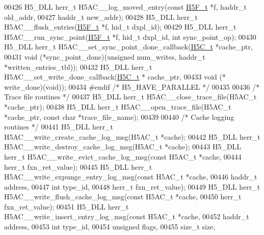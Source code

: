 \begin{DoxyCode}
00426 H5\_DLL herr\_t H5AC\_\_log\_moved\_entry(\textcolor{keyword}{const} \hyperlink{struct_h5_f__t}{H5F\_t} *f, haddr\_t old\_addr,
00427     haddr\_t new\_addr);
00428 H5\_DLL herr\_t H5AC\_\_flush\_entries(\hyperlink{struct_h5_f__t}{H5F\_t} *f, hid\_t dxpl\_id);
00429 H5\_DLL herr\_t H5AC\_\_run\_sync\_point(\hyperlink{struct_h5_f__t}{H5F\_t} *f, hid\_t dxpl\_id, \textcolor{keywordtype}{int} sync\_point\_op);
00430 H5\_DLL herr\_t H5AC\_\_set\_sync\_point\_done\_callback(\hyperlink{struct_h5_c__t}{H5C\_t} *cache\_ptr,
00431     \textcolor{keywordtype}{void} (*sync\_point\_done)(\textcolor{keywordtype}{unsigned} num\_writes, haddr\_t *written\_entries\_tbl));
00432 H5\_DLL herr\_t H5AC\_\_set\_write\_done\_callback(\hyperlink{struct_h5_c__t}{H5C\_t} * cache\_ptr,
00433     \textcolor{keywordtype}{void} (* write\_done)(\textcolor{keywordtype}{void}));
00434 \textcolor{preprocessor}{#endif }\textcolor{comment}{/* H5\_HAVE\_PARALLEL */}\textcolor{preprocessor}{}
00435 
00436 \textcolor{comment}{/* Trace file routines */}
00437 H5\_DLL herr\_t H5AC\_\_close\_trace\_file(H5AC\_t *cache\_ptr);
00438 H5\_DLL herr\_t H5AC\_\_open\_trace\_file(H5AC\_t *cache\_ptr, \textcolor{keyword}{const} \textcolor{keywordtype}{char} *trace\_file\_name);
00439 
00440 \textcolor{comment}{/* Cache logging routines */}
00441 H5\_DLL herr\_t H5AC\_\_write\_create\_cache\_log\_msg(H5AC\_t *cache);
00442 H5\_DLL herr\_t H5AC\_\_write\_destroy\_cache\_log\_msg(H5AC\_t *cache);
00443 H5\_DLL herr\_t H5AC\_\_write\_evict\_cache\_log\_msg(\textcolor{keyword}{const} H5AC\_t *cache,
00444                                         herr\_t fxn\_ret\_value);
00445 H5\_DLL herr\_t H5AC\_\_write\_expunge\_entry\_log\_msg(\textcolor{keyword}{const} H5AC\_t *cache,
00446                                                 haddr\_t address,
00447                                                 \textcolor{keywordtype}{int} type\_id,
00448                                                 herr\_t fxn\_ret\_value);
00449 H5\_DLL herr\_t H5AC\_\_write\_flush\_cache\_log\_msg(\textcolor{keyword}{const} H5AC\_t *cache,
00450                                               herr\_t fxn\_ret\_value);
00451 H5\_DLL herr\_t H5AC\_\_write\_insert\_entry\_log\_msg(\textcolor{keyword}{const} H5AC\_t *cache,
00452                                                haddr\_t address,
00453                                                \textcolor{keywordtype}{int} type\_id,
00454                                                \textcolor{keywordtype}{unsigned} flags,
00455                                                \textcolor{keywordtype}{size\_t} size,

\end{DoxyCode}
